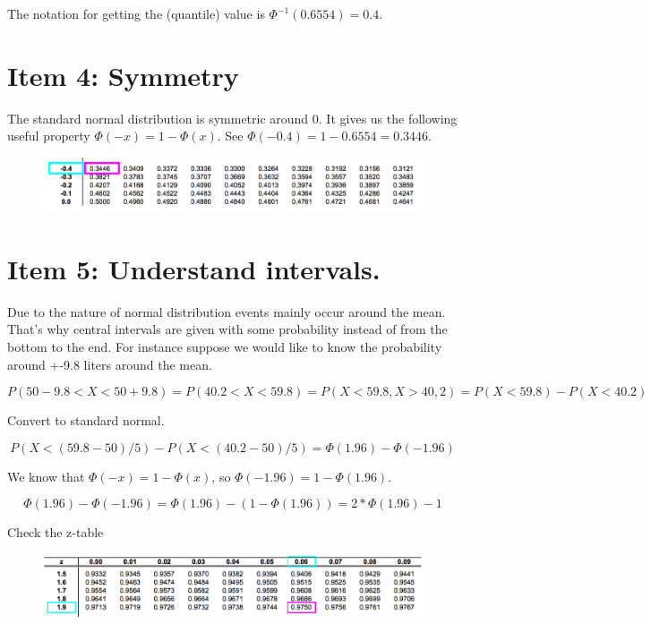 \documentclass[]{book}
\theoremstyle{definition}
\theoremstyle{definition}
\theoremstyle{definition}
\theoremstyle{remark}
\begin{document}
The notation for getting the (quantile) value is
\(\Phi^{-1}(0.6554) = 0.4\).

\hypertarget{item-4-symmetry}{%
\section{Item 4: Symmetry}\label{item-4-symmetry}}

The standard normal distribution is symmetric around 0. It gives us the
following useful property \(\Phi(-x) = 1 - \Phi(x)\). See
\(\Phi(-0.4) = 1 - 0.6554 = 0.3446\).

\begin{figure}
\begin{center}
\includegraphics[width=0.95\columnwidth]{img/ss2}
\end{center}
\end{figure}

\hypertarget{item-5-understand-intervals.}{%
\section{Item 5: Understand
intervals.}\label{item-5-understand-intervals.}}

Due to the nature of normal distribution events mainly occur around the
mean. That's why central intervals are given with some probability
instead of from the bottom to the end. For instance suppose we would
like to know the probability around +-9.8 liters around the mean.

\[P(50 - 9.8 < X < 50 + 9.8) = P(40.2 < X < 59.8) = P(X < 59.8,X > 40,2) = P(X < 59.8) - P(X < 40.2)\]

Convert to standard normal.

\[P(X < (59.8 - 50)/5) - P(X < (40.2 - 50)/5) = \Phi(1.96) - \Phi(-1.96)\]

We know that \(\Phi(-x)= 1 - \Phi(x)\), so
\(\Phi(-1.96) = 1 - \Phi(1.96)\).

\[\Phi(1.96) - \Phi(-1.96) = \Phi(1.96) - (1 - \Phi(1.96)) = 2*\Phi(1.96) - 1\]

Check the z-table

\begin{figure}
\begin{center}
\includegraphics[width=0.95\columnwidth]{img/ss3}
\end{center}
\end{figure}
\end{document}
